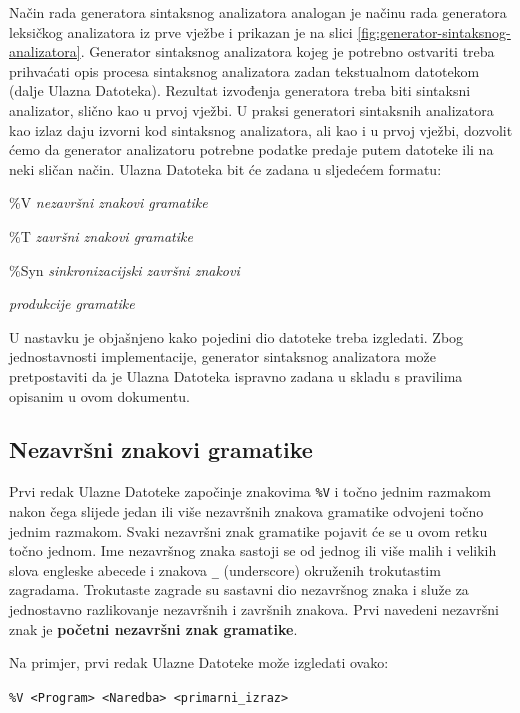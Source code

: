 \documentclass[times, 12pt, utf8]{book}
\begin{document}
Način rada generatora sintaksnog analizatora analogan je načinu rada generatora leksičkog analizatora iz prve vježbe i prikazan je na slici \ref{fig:generator-sintaksnog-analizatora}.
Generator sintaksnog analizatora kojeg je potrebno ostvariti treba prihvaćati opis procesa sintaksnog analizatora zadan tekstualnom datotekom (dalje Ulazna Datoteka).
Rezultat izvođenja generatora treba biti sintaksni analizator, slično kao u prvoj vježbi.
U praksi generatori sintaksnih analizatora kao izlaz daju izvorni kod sintaksnog analizatora, ali kao i u prvoj vježbi, dozvolit ćemo da generator analizatoru potrebne podatke predaje putem datoteke ili na neki sličan način.
Ulazna Datoteka bit će zadana u sljedećem formatu: 

\begin{description}
\itemsep 1pt
\item \%V \emph{nezavršni znakovi gramatike}
\item \%T \emph{završni znakovi gramatike}
\item \%Syn \emph{sinkronizacijski završni znakovi}
\item \emph{produkcije gramatike}
\end{description}

U nastavku je objašnjeno kako pojedini dio datoteke treba izgledati.
Zbog jednostavnosti implementacije, generator sintaksnog analizatora može pretpostaviti da je Ulazna Datoteka ispravno zadana u skladu s pravilima opisanim u ovom dokumentu.

\subsection{Nezavršni znakovi gramatike}

Prvi redak Ulazne Datoteke započinje znakovima \verb|%V| i točno jednim razmakom nakon čega slijede jedan ili više nezavršnih znakova gramatike odvojeni točno jednim razmakom.
Svaki nezavršni znak gramatike pojavit će se u ovom retku točno jednom.
Ime nezavršnog znaka sastoji se od jednog ili više malih i velikih slova engleske abecede i znakova \verb|_| (underscore) okruženih trokutastim zagradama.
Trokutaste zagrade su sastavni dio nezavršnog znaka i služe za jednostavno razlikovanje nezavršnih i završnih znakova.
Prvi navedeni nezavršni znak je \textbf{početni nezavršni znak gramatike}.

Na primjer, prvi redak Ulazne Datoteke može izgledati ovako:

\verb|%V <Program> <Naredba> <primarni_izraz>|
\end{document}
